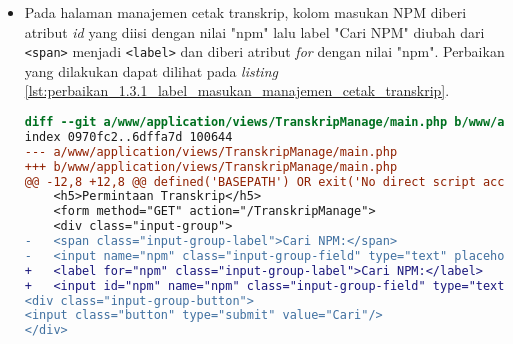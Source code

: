 \begin{itemize}
\begin{lstlisting}[frame=single, label={lst:perbaikan_1.3.1_tag_heading}, language=diff, caption=Perbaikan Kriteria Sukses 1.3.1 - Penggunaan \textit{Heading} Tidak Tepat]
    <div class="callout">
-   <h5>Permohonan Baru</h5>
+   <h1>Permohonan Baru</h1>
    <?php if (is_array($forbiddenTypes)): ?>
    <form method="POST" action="/TranskripRequest/add">
    <input type="hidden" name="<?= $this->security->get_csrf_token_name() ?>" value="<?= $this->security->get_csrf_hash() ?>" />
@@ -57,7 +57,7 @@ defined('BASEPATH') OR exit('No direct script access allowed');
    <?php endif ?>
    </div>
    <div class="callout">
-   <h5>Histori Permohonan</h5>
+   <h1>Histori Permohonan</h1>
    <table class="stack">
    <thead>
    <tr>
@@ -81,7 +81,7 @@ defined('BASEPATH') OR exit('No direct script access allowed');
    <td><?= $request->answeredMessage ?></td>
    <td>
    <div class="reveal" id="detail<?= $request->id ?>" data-reveal>
-   <h5>Detail Permohonan #<?= $request->id ?></h5>
+   <h2>Detail Permohonan #<?= $request->id ?></h2>
    <table class="stack">
    <tbody>
    <tr>
\end{lstlisting}

\item Pada halaman manajemen cetak transkrip, kolom masukan NPM diberi atribut \textit{id} yang diisi dengan nilai "npm" lalu label "Cari NPM" diubah dari \texttt{<span>} menjadi \texttt{<label>} dan diberi atribut \textit{for} dengan nilai "npm". Perbaikan yang dilakukan dapat dilihat pada \textit{listing} \ref{lst:perbaikan_1.3.1_label_masukan_manajemen_cetak_transkrip}.
\begin{lstlisting}[frame=single, label={lst:perbaikan_1.3.1_label_masukan_manajemen_cetak_transkrip}, language=diff, caption=Perbaikan Kriteria Sukses 1.3.1 - Tidak Terdapat Label pada Kolom Masukan di Halaman Manajemen Cetak Transkrip]
diff --git a/www/application/views/TranskripManage/main.php b/www/application/views/TranskripManage/main.php
index 0970fc2..6dffa7d 100644
--- a/www/application/views/TranskripManage/main.php
+++ b/www/application/views/TranskripManage/main.php
@@ -12,8 +12,8 @@ defined('BASEPATH') OR exit('No direct script access allowed');
    <h5>Permintaan Transkrip</h5>
    <form method="GET" action="/TranskripManage">
    <div class="input-group">
-   <span class="input-group-label">Cari NPM:</span>
-   <input name="npm" class="input-group-field" type="text" placeholder="2013730013" maxlength="10" minlength="10"<?= $npmQuery === NULL ? '' : " value='$npmQuery'" ?>/>
+   <label for="npm" class="input-group-label">Cari NPM:</label>
+   <input id="npm" name="npm" class="input-group-field" type="text" placeholder="2013730013" maxlength="10" minlength="10"<?= $npmQuery === NULL ? '' : " value='$npmQuery'" ?>/>
<div class="input-group-button">
<input class="button" type="submit" value="Cari"/>
</div>
\end{lstlisting}


\end{itemize}

